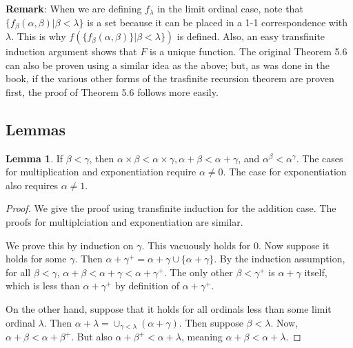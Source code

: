 \documentclass{article}
\theoremstyle{definition}
\newtheorem{lemma}[theorem]{Lemma}
\begin{document}
\textbf{Remark}: When we are defining $f_\lambda$ in the limit ordinal case, note that $\{f_\beta(\alpha,\beta)|\beta<\lambda\}$ is a set because it can be 
placed in a 1-1 correspondence with $\lambda$. This is why $f(\{f_\beta(\alpha,\beta)\}|\beta<\lambda\})$ is defined. Also, an easy transfinite induction argument shows 
that $F$ is a unique function. The original Theorem 5.6 can also be proven using a similar idea as the above; but, as was done in the book, if the various other forms 
of the trasfinite recursion theorem are proven first, the proof of Theorem 5.6 follows more easily.

\subsection*{Lemmas}
\begin{lemma}
If $\beta<\gamma$, then $\alpha\times\beta<\alpha\times\gamma,\alpha+\beta<\alpha+\gamma$, and
$\alpha^\beta<\alpha^\gamma$. The cases for multiplication and exponentiation require $\alpha\ne 0$. The case for
exponentiation also requires $\alpha\ne 1$.
\end{lemma}
\begin{proof}
We give the proof using transfinite induction for the addition case. The proofs for multiplciation and exponentiation are similar.

We prove this by induction on $\gamma$. This vacuously holds for $0$. Now suppose it holds for some
$\gamma$. Then $\alpha+\gamma^+=\alpha+\gamma\cup\{\alpha+\gamma\}$. By the induction assumption, for all
$\beta<\gamma$, $\alpha+\beta<\alpha+\gamma<\alpha+\gamma^+$. The only other $\beta<\gamma^+$ is
$\alpha+\gamma$ itself, which is less than $\alpha+\gamma^+$ by definition of $\alpha+\gamma^+$.

On the other hand, suppose that it holds for all ordinals less than some limit ordinal $\lambda$. Then
$\alpha+\lambda=\cup_{\gamma<\lambda}(\alpha+\gamma)$. Then suppose $\beta<\lambda$. Now,
$\alpha+\beta<\alpha+\beta^+$. But also $\alpha+\beta^+<\alpha+\lambda$, meaning
$\alpha+\beta<\alpha+\lambda$.
\end{proof}
\end{document}
